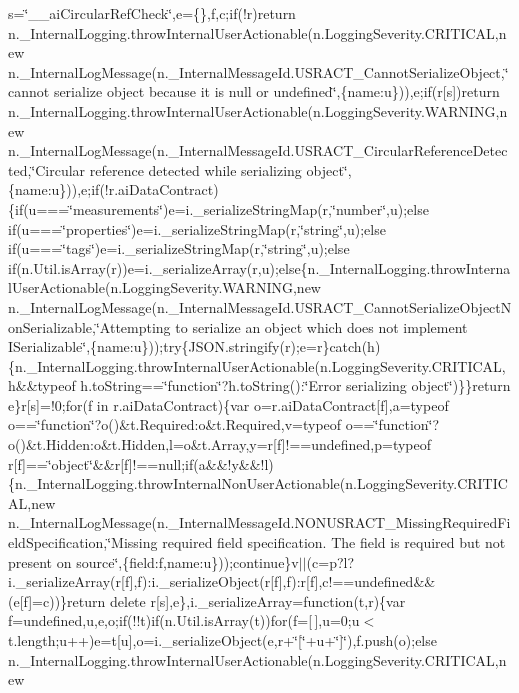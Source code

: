 s=\char`\"{}\+\_\+\+\_\+ai\+Circular\+Ref\+Check\char`\"{},e=\{\},f,c;if(!r)return n.\+\_\+\+Internal\+Logging.\+throw\+Internal\+User\+Actionable(n.\+Logging\+Severity.\+C\+R\+I\+T\+I\+C\+A\+L,new n.\+\_\+\+Internal\+Log\+Message(n.\+\_\+\+Internal\+Message\+Id.\+U\+S\+R\+A\+C\+T\+\_\+\+Cannot\+Serialize\+Object,\char`\"{}cannot serialize object because it is null or undefined\char`\"{},\{name\+:u\})),e;if(r\mbox{[}s\mbox{]})return n.\+\_\+\+Internal\+Logging.\+throw\+Internal\+User\+Actionable(n.\+Logging\+Severity.\+W\+A\+R\+N\+I\+N\+G,new n.\+\_\+\+Internal\+Log\+Message(n.\+\_\+\+Internal\+Message\+Id.\+U\+S\+R\+A\+C\+T\+\_\+\+Circular\+Reference\+Detected,\char`\"{}\+Circular reference detected while serializing object\char`\"{},\{name\+:u\})),e;if(!r.\+ai\+Data\+Contract)\{if(u===\char`\"{}measurements\char`\"{})e=i.\+\_\+serialize\+String\+Map(r,\char`\"{}number\char`\"{},u);else if(u===\char`\"{}properties\char`\"{})e=i.\+\_\+serialize\+String\+Map(r,\char`\"{}string\char`\"{},u);else if(u===\char`\"{}tags\char`\"{})e=i.\+\_\+serialize\+String\+Map(r,\char`\"{}string\char`\"{},u);else if(n.\+Util.\+is\+Array(r))e=i.\+\_\+serialize\+Array(r,u);else\{n.\+\_\+\+Internal\+Logging.\+throw\+Internal\+User\+Actionable(n.\+Logging\+Severity.\+W\+A\+R\+N\+I\+N\+G,new n.\+\_\+\+Internal\+Log\+Message(n.\+\_\+\+Internal\+Message\+Id.\+U\+S\+R\+A\+C\+T\+\_\+\+Cannot\+Serialize\+Object\+Non\+Serializable,\char`\"{}\+Attempting to serialize an object which does not implement I\+Serializable\char`\"{},\{name\+:u\}));try\{\+J\+S\+O\+N.\+stringify(r);e=r\}catch(h)\{n.\+\_\+\+Internal\+Logging.\+throw\+Internal\+User\+Actionable(n.\+Logging\+Severity.\+C\+R\+I\+T\+I\+C\+A\+L,h\&\&typeof h.\+to\+String==\char`\"{}function\char`\"{}?h.\+to\+String()\+:\char`\"{}\+Error serializing object\char`\"{})\}\}return e\}r\mbox{[}s\mbox{]}=!0;for(f in r.\+ai\+Data\+Contract)\{var o=r.\+ai\+Data\+Contract\mbox{[}f\mbox{]},a=typeof o==\char`\"{}function\char`\"{}?o()\&t.\+Required\+:o\&t.\+Required,v=typeof o==\char`\"{}function\char`\"{}?o()\&t.\+Hidden\+:o\&t.\+Hidden,l=o\&t.\+Array,y=r\mbox{[}f\mbox{]}!==undefined,p=typeof r\mbox{[}f\mbox{]}==\char`\"{}object\char`\"{}\&\&r\mbox{[}f\mbox{]}!==null;if(a\&\&!y\&\&!l)\{n.\+\_\+\+Internal\+Logging.\+throw\+Internal\+Non\+User\+Actionable(n.\+Logging\+Severity.\+C\+R\+I\+T\+I\+C\+A\+L,new n.\+\_\+\+Internal\+Log\+Message(n.\+\_\+\+Internal\+Message\+Id.\+N\+O\+N\+U\+S\+R\+A\+C\+T\+\_\+\+Missing\+Required\+Field\+Specification,\char`\"{}\+Missing required field specification. The field is required but not present on source\char`\"{},\{field\+:f,name\+:u\}));continue\}v$\vert$$\vert$(c=p?l?i.\+\_\+serialize\+Array(r\mbox{[}f\mbox{]},f)\+:i.\+\_\+serialize\+Object(r\mbox{[}f\mbox{]},f)\+:r\mbox{[}f\mbox{]},c!==undefined\&\&(e\mbox{[}f\mbox{]}=c))\}return delete r\mbox{[}s\mbox{]},e\},i.\+\_\+serialize\+Array=function(t,r)\{var f=undefined,u,e,o;if(!!t)if(n.\+Util.\+is\+Array(t))for(f=\mbox{[}$\,$\mbox{]},u=0;u$<$t.\+length;u++)e=t\mbox{[}u\mbox{]},o=i.\+\_\+serialize\+Object(e,r+\char`\"{}\mbox{[}\char`\"{}+u+\char`\"{}\mbox{]}\char`\"{}),f.\+push(o);else n.\+\_\+\+Internal\+Logging.\+throw\+Internal\+User\+Actionable(n.\+Logging\+Severity.\+C\+R\+I\+T\+I\+C\+A\+L,new 